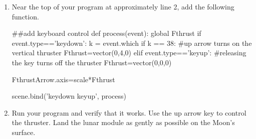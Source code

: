 \begin{enumerate}
\item Near the top of your program at approximately line 2, add the following function.

\begin{myvpython}
##add keyboard control
def process(event):
    global Fthrust
    if event.type=='keydown':
        k = event.which
        if k == 38: #up arrow turns on the vertical thruster
            Fthrust=vector(0,4,0)
    elif event.type=='keyup': #releasing the key turns off the thruster
        Fthrust=vector(0,0,0)

    FthrustArrow.axis=scale*Fthrust
        
scene.bind('keydown keyup', process) 
\end{myvpython}

        
\item Run your program and verify that it works. Use the up arrow key to control the thruster. Land the lunar module as gently as possible on the Moon's surface.

\end{enumerate}

\pagebreak

\analysis

